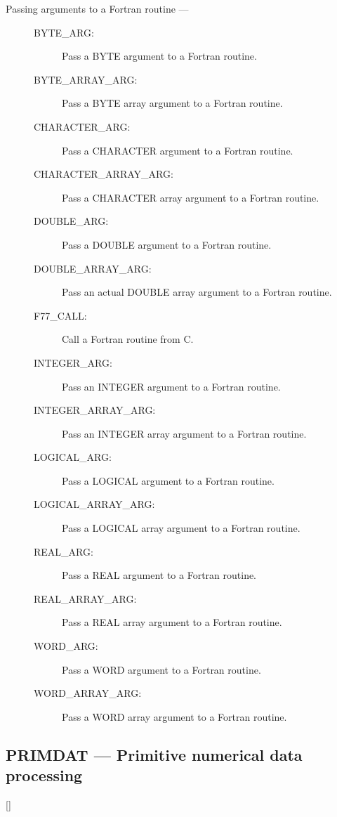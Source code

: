 \begin{description}
\item [Passing arguments to a Fortran routine ---]

\begin{description}
\item [BYTE\_ARG:]  Pass a BYTE argument to a Fortran routine.
\item [BYTE\_ARRAY\_ARG:]  Pass a BYTE array argument to a Fortran routine.
\item [CHARACTER\_ARG:]  Pass a CHARACTER argument to a Fortran routine.
\item [CHARACTER\_ARRAY\_ARG:]  Pass a CHARACTER array argument to a Fortran routine.
\item [DOUBLE\_ARG:]  Pass a DOUBLE argument to a Fortran routine.
\item [DOUBLE\_ARRAY\_ARG:]  Pass an actual DOUBLE array argument to a Fortran routine.
\item [F77\_CALL:]  Call a Fortran routine from C.
\item [INTEGER\_ARG:]  Pass an INTEGER argument to a Fortran routine.
\item [INTEGER\_ARRAY\_ARG:]  Pass an INTEGER array argument to a Fortran routine.
\item [LOGICAL\_ARG:]  Pass a LOGICAL argument to a Fortran routine.
\item [LOGICAL\_ARRAY\_ARG:]  Pass a LOGICAL array argument to a Fortran routine.
\item [REAL\_ARG:]  Pass a REAL argument to a Fortran routine.
\item [REAL\_ARRAY\_ARG:]  Pass a REAL array argument to a Fortran routine.
\item [WORD\_ARG:]  Pass a WORD argument to a Fortran routine.
\item [WORD\_ARRAY\_ARG:]  Pass a WORD array argument to a Fortran routine.
\end{description}

\end{description}

\newpage

\subsection{PRIMDAT --- Primitive numerical data processing}

\vspace{-9mm}

\hfill []

\vspace{2mm}

